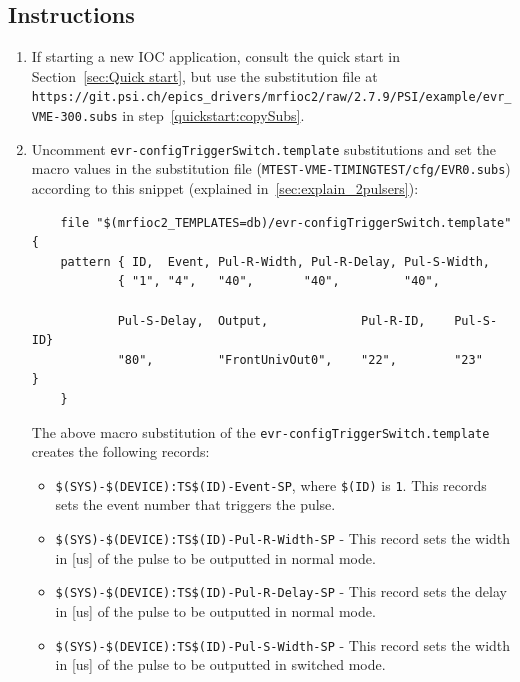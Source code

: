 \documentclass[12pt,a4paper]{article}
\newcommand{\latestDriverVersion}{2.7.9}
\begin{document}
\subsection{Instructions}
\begin{enumerate}
	\item If starting a new IOC application, consult the quick start in Section~\ref{sec:Quick start}, but use the substitution file at \texttt{https://git.psi.ch/epics\_drivers/}\newline \texttt{mrfioc2/raw/\latestDriverVersion/PSI/example/evr\_VME-300.subs} in step~\ref{quickstart:copySubs}.

	\item Uncomment \texttt{evr-configTriggerSwitch.template} substitutions and set the macro values in the substitution file \newline(\texttt{MTEST-VME-TIMINGTEST/cfg/EVR0.subs}) according to this snippet (explained in~\ref{sec:explain_2pulsers}):
\begin{verbatim}
	file "$(mrfioc2_TEMPLATES=db)/evr-configTriggerSwitch.template"{
	pattern { ID,  Event, Pul-R-Width, Pul-R-Delay, Pul-S-Width,
	        { "1", "4",   "40",       "40",         "40",            
      
	        Pul-S-Delay,  Output,             Pul-R-ID,    Pul-S-ID}
	        "80",         "FrontUnivOut0",    "22",        "23"    }
	}
\end{verbatim}
	The above macro substitution of the \texttt{evr-configTriggerSwitch.template} creates the following records:
	\begin{itemize}
		\item \texttt{\$(SYS)-\$(DEVICE):TS\$(ID)-Event-SP}, where \texttt{\$(ID)} is \texttt{1}. This records sets the event number that triggers the pulse.
		
		\item \texttt{\$(SYS)-\$(DEVICE):TS\$(ID)-Pul-R-Width-SP} - This record sets the width in [us] of the pulse to be outputted in normal mode. 
		
		\item \texttt{\$(SYS)-\$(DEVICE):TS\$(ID)-Pul-R-Delay-SP} - This record sets the delay in [us] of the pulse to be outputted in normal mode. 
		
		\item \texttt{\$(SYS)-\$(DEVICE):TS\$(ID)-Pul-S-Width-SP} - This record sets the width in [us] of the pulse to be outputted in switched mode.
		

\end{itemize}
\end{enumerate}
\end{document}
